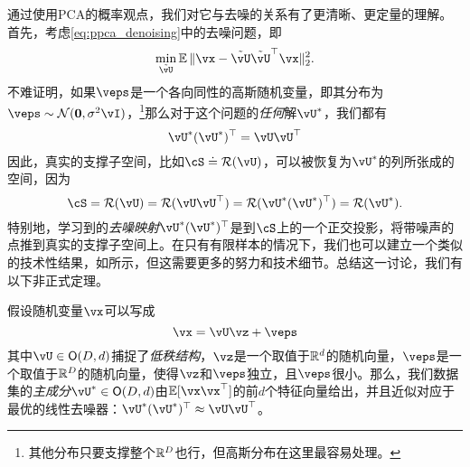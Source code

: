 \documentclass[../../book-main.tex]{subfiles}
\begin{document}
\begin{remark}
    通过使用PCA的概率观点，我们对它与去噪的关系有了更清晰、更定量的理解。首先，考虑\eqref{eq:ppca_denoising}中的去噪问题，即
    \begin{equation}
        \min_{\tilde{\vU}}\Ex\norm{\vx - \tilde{\vU}\tilde{\vU}^{\top}\vx}_{2}^{2}.
    \end{equation}
    不难证明，如果\(\veps\)是一个各向同性的高斯随机变量，即其分布为\(\veps \sim \dNorm(\vzero, \sigma^{2}\vI)\)，\footnote{其他分布只要支撑整个\(\mathbb{R}^{D}\)也行，但高斯分布在这里最容易处理。}那么对于这个问题的\textit{任何}解\(\vU^{\ast}\)，我们都有
    \begin{equation}
        \vU^{\ast}(\vU^{\ast})^{\top} = \vU\vU^{\top}
    \end{equation}
    因此，真实的支撑子空间，比如\(\cS \doteq \Range(\vU)\)，可以被恢复为\(\vU^{\ast}\)的列所张成的空间，因为
    \begin{equation}
        \cS = \Range(\vU) = \Range(\vU\vU^{\top}) = \Range(\vU^{\ast}(\vU^{\ast})^{\top}) = \Range(\vU^{\ast}).
    \end{equation}
    特别地，学习到的\textit{去噪映射}\(\vU^{\ast}(\vU^{\ast})^{\top}\)是到\(\cS\)上的一个正交投影，将带噪声的点推到真实的支撑子空间上。在只有有限样本的情况下，我们也可以建立一个类似的技术性结果，如所示，但这需要更多的努力和技术细节。总结这一讨论，我们有以下非正式定理。
\end{remark}


\begin{theorem}\label{thm:ppca}
    假设随机变量\(\vx\)可以写成
    \begin{equation}
        \vx = \vU\vz + \veps
    \end{equation}
    其中\(\vU \in \O(D, d)\)捕捉了\textit{低秩结构}，\(\vz\)是一个取值于\(\mathbb{R}^{d}\)的随机向量，\(\veps\)是一个取值于\(\mathbb{R}^{D}\)的随机向量，使得\(\vz\)和\(\veps\)独立，且\(\veps\)很小。那么，我们数据集的\textit{主成分}\(\vU^{\ast} \in \O(D, d)\)由\(\Ex[\vx\vx^{\top}]\)的前\(d\)个特征向量给出，并且近似对应于最优的线性去噪器：\(\vU^{\ast}(\vU^{\ast})^{\top} \approx \vU\vU^{\top}\)。
\end{theorem}


\end{document}
